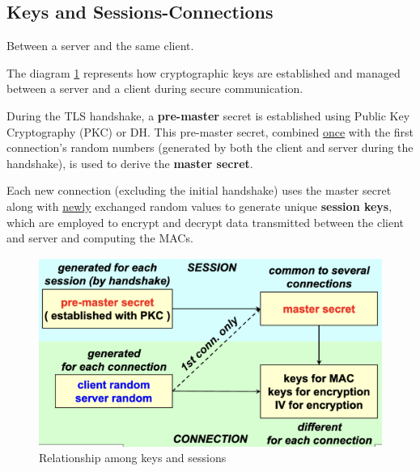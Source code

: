 \subsection{Keys and Sessions-Connections}
\begin{center}
    Between a server and the same client.
\end{center}

\noindent The diagram \ref{fig:rel_keys} represents how cryptographic keys are established and managed between a server and a client during secure communication.

\vspace{0.5cm}

During the TLS handshake, a \textbf{pre-master} secret is established using Public Key Cryptography (PKC) or DH. This pre-master secret, combined \uline{once} with the first connection's random numbers (generated by both the client and server during the handshake), is used to derive the \textbf{master secret}. 

\vspace{0.5cm}

Each new connection (excluding the initial handshake) uses the master secret along with \uline{newly} exchanged random values to generate unique \textbf{session keys}, which are employed to encrypt and decrypt data transmitted between the client and server and computing the MACs.

\begin{figure}[H]
    \centering
    \includegraphics[width=0.6\linewidth]{Images/Appsec/rel_keys.png}
    \caption{Relationship among keys and sessions}
    \label{fig:rel_keys}
\end{figure}

